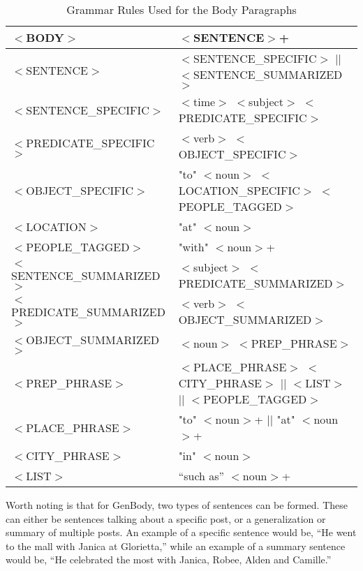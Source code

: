 \begin{table}[ph!]   
	\centering
	\caption{Grammar Rules Used for the Body Paragraphs} \vspace{0.25em}
	\begin{tabular}{|p{2.4in}|p{3in}|} \hline
		{$<$BODY$>$}  & {$<$SENTENCE$>$+} \\ \hline
		$<$SENTENCE$>$ & $<$SENTENCE\_SPECIFIC$>$ $|$$|$ $<$SENTENCE\_SUMMARIZED$>$ \\ \hline
		$<$SENTENCE\_SPECIFIC$>$ & $<$time$>$ $<$subject$>$ $<$PREDICATE\_SPECIFIC$>$\\ \hline
		$<$PREDICATE\_SPECIFIC$>$ & $<$verb$>$ $<$OBJECT\_SPECIFIC$>$ \\ \hline
		$<$OBJECT\_SPECIFIC$>$ & "to" $<$noun$>$ $<$LOCATION\_SPECIFIC$>$ $<$PEOPLE\_TAGGED$>$ \\ \hline
		$<$LOCATION$>$ & "at" $<$noun$>$ \\ \hline
		$<$PEOPLE\_TAGGED$>$ & "with" $<$noun$>$+ \\ \hline
		$<$SENTENCE\_SUMMARIZED$>$ & $<$subject$>$ $<$PREDICATE\_SUMMARIZED$>$\\ \hline
		$<$PREDICATE\_SUMMARIZED$>$ & $<$verb$>$ $<$OBJECT\_SUMMARIZED$>$ \\ \hline
		$<$OBJECT\_SUMMARIZED$>$ & $<$noun$>$ $<$PREP\_PHRASE$>$ \\ \hline
		$<$PREP\_PHRASE$>$ & $<$PLACE\_PHRASE$>$ $<$CITY\_PHRASE$>$ $|$$|$ \newline $<$LIST$>$ $|$$|$ \newline $<$PEOPLE\_TAGGED$>$ \\ \hline
		$<$PLACE\_PHRASE$>$ & "to" $<$noun$>$+ $|$$|$ \newline "at" $<$noun$>$+ \\ \hline
		$<$CITY\_PHRASE$>$ & "in" $<$noun$>$ \\ \hline
		$<$LIST$>$ & ``such as” $<$noun$>$+ \\ \hline
	\end{tabular}
	\label{tab:GrammarRules-bodypar}
\end{table}

Worth noting is that for GenBody, two types of sentences can be formed. These can either be sentences talking about a specific post, or a generalization or summary of multiple posts. An example of a specific sentence would be, ``He went to the mall with Janica at Glorietta,'' while an example of a summary sentence would be, ``He celebrated the most with Janica, Robee, Alden and Camille.''

